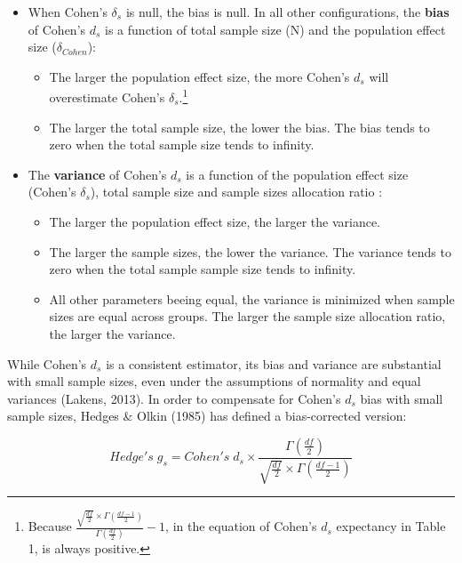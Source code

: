 \documentclass[
  man,floatsintext]{apa6}
\providecommand{\tightlist}{%
  \setlength{\itemsep}{0pt}\setlength{\parskip}{0pt}}
\begin{document}
\begin{itemize}
\tightlist
\item
  When Cohen's \(\delta_s\) is null, the bias is null. In all other configurations, the \textbf{bias} of Cohen's \(d_s\) is a function of total sample size (N) and the population effect size (\(\delta_{Cohen}\)):

  \begin{itemize}
  \tightlist
  \item
    The larger the population effect size, the more Cohen's \(d_s\) will overestimate Cohen's \(\delta_s\).\footnote{Because  $\frac{\sqrt{\frac{df}{2}} \times \Gamma(\frac{df-1}{2})}{\Gamma(\frac{df}{2})}-1$, in the equation of Cohen's $d_s$ expectancy in Table 1, is always positive.}\\
  \item
    The larger the total sample size, the lower the bias. The bias tends to zero when the total sample size tends to infinity.
  \end{itemize}
\item
  The \textbf{variance} of Cohen's \(d_s\) is a function of the population effect size (Cohen's \(\delta_s\)), total sample size and sample sizes allocation ratio :

  \begin{itemize}
  \tightlist
  \item
    The larger the population effect size, the larger the variance.
  \item
    The larger the sample sizes, the lower the variance. The variance tends to zero when the total sample sample size tends to infinity.\\
  \item
    All other parameters beeing equal, the variance is minimized when sample sizes are equal across groups. The larger the sample size allocation ratio, the larger the variance.
  \end{itemize}
\end{itemize}

While Cohen's \(d_s\) is a consistent estimator, its bias and variance are substantial with small sample sizes, even under the assumptions of normality and equal variances (Lakens, 2013). In order to compensate for Cohen's \(d_s\) bias with small sample sizes, Hedges \& Olkin (1985) has defined a bias-corrected version:

\begin{equation} 
Hedge's \; g_s = Cohen's \; d_s \times \frac{\Gamma(\frac{df}{2})}{\sqrt{\frac{df}{2}} \times \Gamma(\frac{df-1}{2})}
\label{eq:Hedgesgs}
\end{equation}
\end{document}
